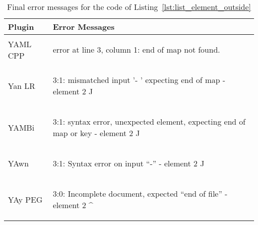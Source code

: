 \begin{table}[H]
  \caption{Final error messages for the  code of Listing~\ref{lst:list_element_outside}}
  \label{tab:error_messages_final_list_element_outside}

  \centering
  \begin{tabular}{lp{}}
    \toprule
    Plugin & Error Messages\\
    \midrule

    \vspace{0cm}
    YAML CPP &
    \vspace{-0.36cm}
    \begin{textcode}
      error at line 3, column 1: end of map not found.
    \end{textcode}
    \\

    \vspace{0cm}
    Yan LR &
    \vspace{-0.36cm}
    \begin{textcode}
      3:1: mismatched input '- ' expecting end of map
           - element 2
           ^^
    \end{textcode}
    \\

    \vspace{0cm}
    YAMBi &
    \vspace{-0.36cm}
    \begin{textcode}
      3:1: syntax error, unexpected element,
           expecting end of map or key
           - element 2
           ^^
    \end{textcode}
    \\

    \vspace{0cm}
    YAwn &
    \vspace{-0.36cm}
    \begin{textcode}
      3:1: Syntax error on input “-”
           - element 2
           ^^
    \end{textcode}
    \\

    \vspace{0cm}
    YAy PEG &
    \vspace{-0.36cm}
    \begin{textcode}
      3:0: Incomplete document, expected “end of file”
           - element 2
           ^
    \end{textcode}
    \\

    \bottomrule

  \end{tabular}
\end{table}

